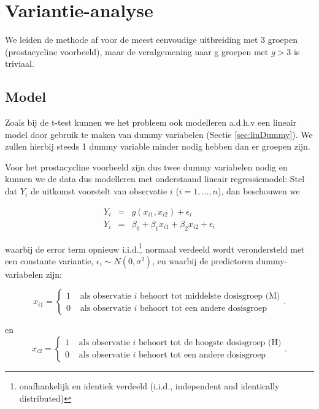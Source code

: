 \documentclass[
  12pt,dutch,coursenotes]{book}
\begin{document}
\hypertarget{variantie-analyse}{%
\section{Variantie-analyse}\label{variantie-analyse}}

We leiden de methode af voor de meest eenvoudige uitbreiding met 3 groepen (prostacycline voorbeeld), maar de veralgemening naar g groepen met \(g>3\) is triviaal.

\hypertarget{model-2}{%
\subsection{Model}\label{model-2}}

Zoals bij de t-test kunnen we het probleem ook modelleren a.d.h.v een lineair model door gebruik te maken van dummy variabelen (Sectie \ref{sec:linDummy}).
We zullen hierbij steeds 1 dummy variable minder nodig hebben dan er groepen zijn.

Voor het prostacycline voorbeeld zijn dus twee dummy variabelen nodig en kunnen we de data dus modelleren met onderstaand lineair regressiemodel:
Stel dat \(Y_i\) de uitkomst voorstelt van observatie \(i\) (\(i=1,\ldots, n\)), dan beschouwen we

\begin{eqnarray}
  Y_i &=& g(x_{i1},x_{i2}) + \epsilon_i\\
  Y_i &=& \beta_0+\beta_1 x_{i1} +\beta_2 x_{i2} +\epsilon_i \label{eq:regmu3}
\end{eqnarray}

waarbij de error term opnieuw i.i.d.\footnote{onafhankelijk en identiek verdeeld (i.i.d., independent and identically distributed)} normaal verdeeld wordt verondersteld met een constante variantie, \(\epsilon_i\sim N(0,\sigma^2)\), en waarbij de predictoren dummy-variabelen zijn:

\[x_{i1} = \left\{ \begin{array}{ll}
1 & \text{ als observatie $i$ behoort tot middelste dosisgroep (M)} \\
0 & \text{ als observatie $i$ behoort tot  een andere dosisgroep} \end{array}\right. .\]

en
\[x_{i2} = \left\{ \begin{array}{ll}
1 & \text{ als observatie $i$ behoort tot de hoogste dosisgroep (H)} \\
0 & \text{ als observatie $i$ behoort tot een andere dosisgroep} \end{array}\right. .\]
\end{document}
